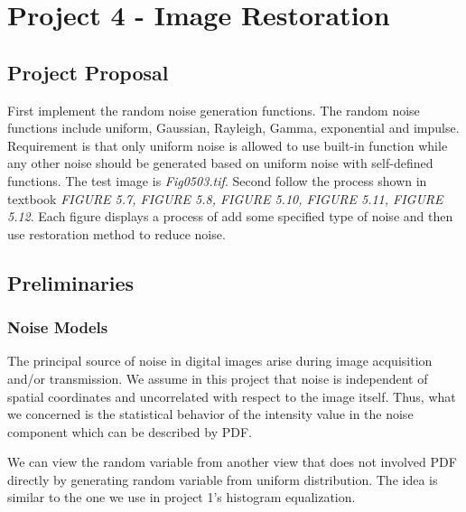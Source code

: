 \section{Project 4 - Image Restoration}
\subsection{Project Proposal}
First implement the random noise generation functions. The random noise functions include uniform, Gaussian, Rayleigh, Gamma, exponential and impulse. Requirement is that only uniform noise is allowed to use built-in function while any other noise should be generated based on uniform noise with self-defined functions. The test image is \emph{Fig0503.tif}.
Second follow the process shown in textbook \emph{FIGURE 5.7, FIGURE 5.8, FIGURE 5.10, FIGURE 5.11, FIGURE 5.12}. Each figure displays a process of add some specified type of noise and then use restoration method to reduce noise.

\subsection{Preliminaries}
\subsubsection{Noise Models}
The principal source of noise in digital images arise during image acquisition and/or transmission. We assume in this project that noise is independent of spatial coordinates and uncorrelated with respect to the image itself. Thus, what we concerned is the statistical behavior of the intensity value in the noise component which can be described by PDF. 

We can view the random variable from another view that does not involved PDF directly by generating random variable from uniform distribution. The idea is similar to the one we use in project 1's histogram equalization. 




